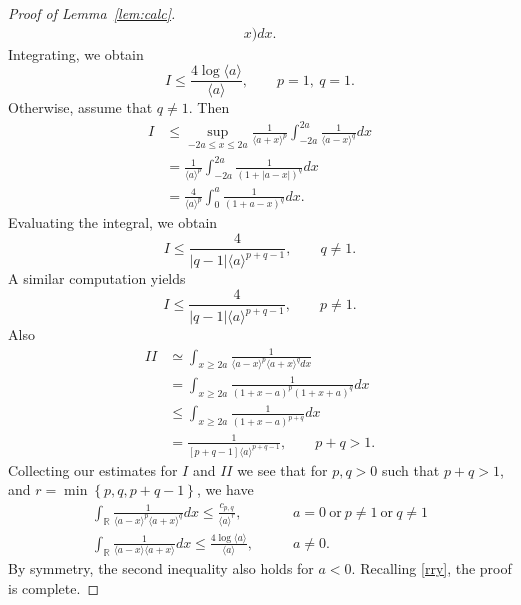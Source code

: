 \documentclass[12pt,reqno]{amsart}
\numberwithin{equation}{section}  %
\numberwithin{figure}{section}
\newcommand{\rr}{\mathbb{R}}
\begin{document}
\begin{proof}[Proof of Lemma~\ref{lem:calc}]
\begin{equation*}
\begin{split}
{  x)} d x.
\end{split}
\end{equation*}
%
%
Integrating, we obtain
%
%
\begin{equation*}
 I
 \le 
 \frac{4 \log \langle a \rangle}{\langle a \rangle}, \qquad p =1, \ q =1.
\end{equation*}
Otherwise, assume that $q \neq 1$. Then
\begin{equation*}
\begin{split}
  I
  & \le \sup_{-2a \le x \le 2a} \frac{1}{\langle a + x \rangle
  ^{p}} \int_{-2a}^{2a} \frac{1}{\langle a - x \rangle ^{q}} d x
  \\
  & = \frac{1}{\langle a \rangle ^{p}} \int_{-2a}^{2a} \frac{1}{(1 + | a -
  x
  |)^{q}} d x
  \\
  & = \frac{4}{\langle a \rangle ^{p}} \int_{0}^{a} \frac{1}{(1 + a -
  x)^{q}} d x.
\end{split}
\end{equation*}
Evaluating the integral, we obtain
\begin{equation*}
  I \le \frac{4}{|q-1| \langle a \rangle ^{p +q -1}}, \qquad q \neq 1.
\end{equation*}
%
%
A similar computation yields
\begin{equation*}
  I \le \frac{4}{|q-1| \langle a \rangle ^{p +q -1}}, \qquad p \neq 1.
\end{equation*}
%
%
Also
%
%
\begin{equation*}
\begin{split}
  II 
  & \simeq \int_{x \ge 2a} \frac{1}{\langle a - x \rangle ^{p} \langle a
  + x \rangle ^{q} d x}
  \\ 
  & = \int_{x \ge 2a} \frac{1}{(1 + x - a)^{p} (1 + x +
  a)^{q}} d x
  \\
  & \le \int_{x \ge 2a} \frac{1}{(1 + x -a)^{p+q}} d x
  \\
  & = \frac{1}{[p + q-1] \langle a \rangle ^{p+q -1}}, \qquad p + q > 1.
\end{split}
\end{equation*}
%
%
Collecting our estimates for $I$ and $II$ we see that for 
$p, q > 0$ such that $p +q >1$, and $r =\min\left\{p, q, p+q-1
 \right\}$, we have 
%
\begin{align*}
  \int_{\rr} \frac{1}{\langle a - x \rangle ^{p} \langle a + x \rangle
  ^{q}} d x
  \le \frac{c_{p,q}}{\langle a \rangle ^{r}}, \qquad & a = 0 \ \text{or} \
  p \neq 1 \ \text{or} \ q \neq 1
  \\
   \int_{\rr} \frac{1}{\langle a - x \rangle  \langle a + x \rangle
} d x
  \le  \frac{4 \log \langle a \rangle}{\langle a \rangle}, \qquad & a \neq 0.
  \label{est-2}
\end{align*}
By symmetry, the second inequality also holds for $a < 0$. Recalling
\eqref{rry}, the proof is complete.
\end{proof}
\end{document}
